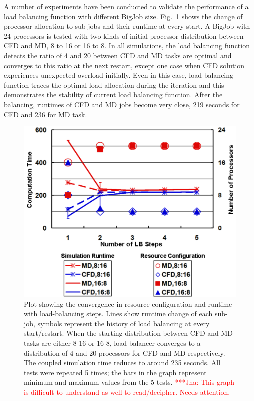 \documentclass[conference,final]{IEEEtran}
\newcommand{\jhanote}[1]{ {\textcolor{red} { ***Jha: #1 }}}
\newcommand{\jhanote}[1]{}
\begin{document}
A number of experiments have been conducted to validate the
performance of a load balancing function with different BigJob size.
Fig.~\ref{fig:LB_Graph} shows the change of processor allocation to
sub-jobs and their runtime at every start. A BigJob with 24 processors
is tested with two kinds of initial processor distribution between CFD
and MD, 8 to 16 or 16 to 8. In all simulations, the load balancing
function detects the ratio of 4 and 20 between CFD and MD tasks are
optimal and converges to this ratio at the next restart, except one
case when CFD solution experiences unexpected overload initially. Even
in this case, load balancing function traces the optimal load
allocation during the iteration and this demonstrates the stability of
current load balancing function. After the balancing, runtimes of CFD
and MD jobs become very close, 219 seconds for CFD and 236 for MD
task.

\begin{figure} \centering \includegraphics[scale=0.45]{LB_Graph2} \caption{\small Plot showing the convergence in resource configuration and runtime with load-balancing steps.  Lines show runtime change of each sub-job, symbols represent the history of load balancing at every start/restart. When the starting distribution between CFD and MD tasks are either 8-16 or 16-8, load balancer converges to a distribution of 4 and 20 processors for CFD and MD respectively. The coupled simulation time reduces to around 235 seconds. All tests were repeated 5 times; the bars in the graph represent minimum and maximum values from the 5 tests. \jhanote{This graph is difficult to understand as well to read/decipher. Needs attention.} } %
\label{fig:LB_Graph}
\end{figure}
\end{document}
